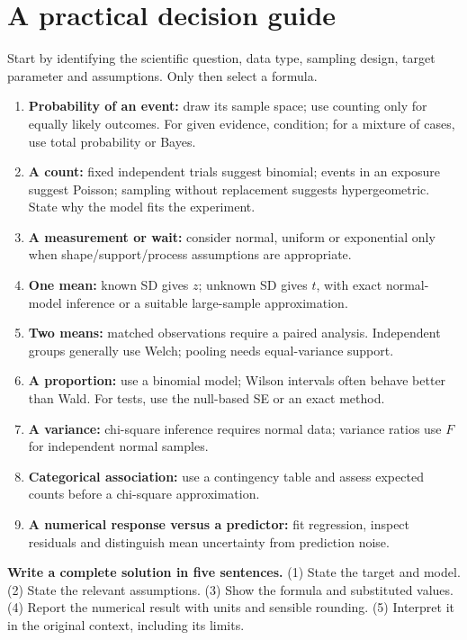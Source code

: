 \section{A practical decision guide}
Start by identifying the scientific question, data type, sampling design,
target parameter and assumptions. Only then select a formula.
\begin{enumerate}
\item \textbf{Probability of an event:} draw its sample space; use counting
only for equally likely outcomes. For given evidence, condition; for a
mixture of cases, use total probability or Bayes.
\item \textbf{A count:} fixed independent trials suggest binomial; events
in an exposure suggest Poisson; sampling without replacement suggests
hypergeometric. State why the model fits the experiment.
\item \textbf{A measurement or wait:} consider normal, uniform or
exponential only when shape/support/process assumptions are appropriate.
\item \textbf{One mean:} known SD gives $z$; unknown SD gives $t$, with
exact normal-model inference or a suitable large-sample approximation.
\item \textbf{Two means:} matched observations require a paired analysis.
Independent groups generally use Welch; pooling needs equal-variance support.
\item \textbf{A proportion:} use a binomial model; Wilson intervals often
behave better than Wald. For tests, use the null-based SE or an exact method.
\item \textbf{A variance:} chi-square inference requires normal data;
variance ratios use $F$ for independent normal samples.
\item \textbf{Categorical association:} use a contingency table and assess
expected counts before a chi-square approximation.
\item \textbf{A numerical response versus a predictor:} fit regression,
inspect residuals and distinguish mean uncertainty from prediction noise.
\end{enumerate}

\textbf{Write a complete solution in five sentences.} (1) State the target
and model. (2) State the relevant assumptions. (3) Show the formula and
substituted values. (4) Report the numerical result with units and sensible
rounding. (5) Interpret it in the original context, including its limits.


